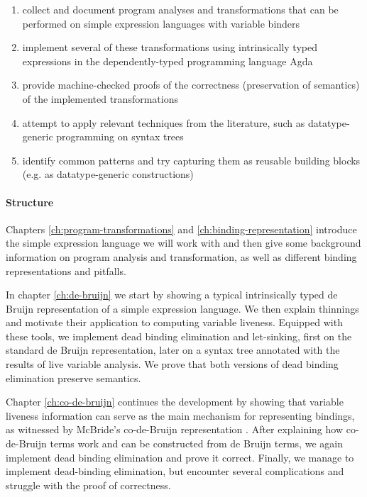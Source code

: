 {      \begin{enumerate}
        \item collect and document program analyses and transformations that can be performed on simple expression languages with variable binders
        \item implement several of these transformations using intrinsically typed expressions in the dependently-typed programming language Agda
        \item provide machine-checked proofs of the correctness (preservation of semantics) of the implemented transformations
        \item attempt to apply relevant techniques from the literature, such as datatype-generic programming on syntax trees
        \item identify common patterns and try capturing them as reusable building blocks (e.g. as datatype-generic constructions)
      \end{enumerate}
    }

  \paragraph{Structure}
    Chapters \ref{ch:program-transformations} and \ref{ch:binding-representation}
    introduce the simple expression language we will work with
    and then give some background information on program analysis and transformation,
    as well as different binding representations and pitfalls.

    In chapter \ref{ch:de-bruijn} we start by
    showing a typical intrinsically typed de Bruijn representation of a simple expression language.
    We then explain thinnings and motivate their application to computing variable liveness.
    Equipped with these tools,
    we implement dead binding elimination and let-sinking,
    first on the standard de Bruijn representation,
    later on a syntax tree annotated with the results of live variable analysis.
    We prove that both versions of dead binding elimination preserve semantics.

    Chapter \ref{ch:co-de-bruijn} continues the development by showing that variable liveness information
    can serve as the main mechanism for representing bindings, as witnessed by
    McBride's co-de-Bruijn representation
    \cite{McBride2018EveryBodysGotToBeSomewhere}.
    After explaining how co-de-Bruijn terms work and can be constructed from de Bruijn terms,
    we again implement dead binding elimination and prove it correct.
    Finally, we manage to implement dead-binding elimination, but encounter several complications
    and struggle with the proof of correctness.

